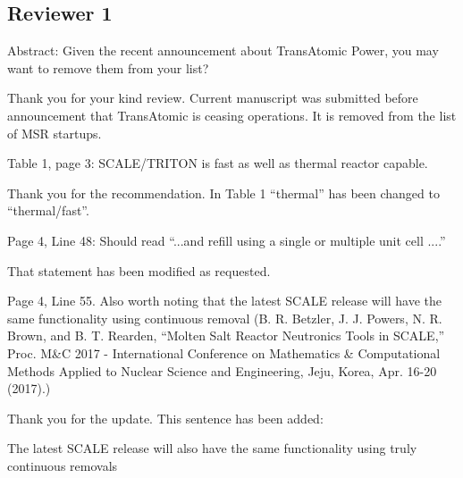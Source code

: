 \documentclass[answers,11pt]{exam}
\begin{document}
\begin{questions}
        \section*{Reviewer 1}

        \question  Abstract: Given the recent announcement about TransAtomic 
        Power, you may want to remove them from your list?
        \begin{solution}
        		Thank you for your kind review. Current manuscript was submitted before 
		        announcement that TransAtomic is ceasing operations. It is removed from 
		        the list of MSR startups.
        \end{solution}

        \question  Table 1, page 3: SCALE/TRITON is fast as well as thermal 
        reactor capable.  
        \begin{solution}
		        Thank you for the recommendation. In Table 1 ``thermal'' has been changed 
		        to ``thermal/fast''.
        \end{solution}

        \question  Page 4, Line 48: Should read ``...and refill using a single 
        or multiple unit cell ....''
        \begin{solution}
        		That statement has been modified as requested.
        \end{solution}

        \question  Page 4, Line 55. Also worth noting that the latest SCALE 
        release will have the same functionality using continuous removal (B. 
        R. Betzler, J. J. Powers, N. R. Brown, and B. T. Rearden, ``Molten Salt 
        Reactor Neutronics Tools in SCALE,'' Proc. M\&C 2017 - International 
        Conference on Mathematics \& Computational Methods Applied to Nuclear 
        Science and Engineering, Jeju, Korea, Apr. 16-20 (2017).)
        \begin{solution}
		        Thank you for the update. This sentence has been added:
        
		        The latest SCALE release will also have the same functionality using 
        		truly continuous removals \cite{betzler_implementation_2017}
        \end{solution}


\end{questions}
\end{document}
